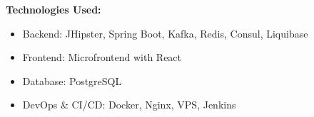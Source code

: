 \documentclass[11pt,a4paper]{article}
\begin{document}
\begin{adjustwidth}{2em}{}
\textbf{Technologies Used:}
\begin{itemize}[leftmargin=*]
    \item Backend: JHipster, Spring Boot, Kafka, Redis, Consul, Liquibase
    \item Frontend: Microfrontend with React
    \item Database: PostgreSQL
    \item DevOps \& CI/CD: Docker, Nginx, VPS, Jenkins
\end{itemize}
\end{adjustwidth}
\end{document}
